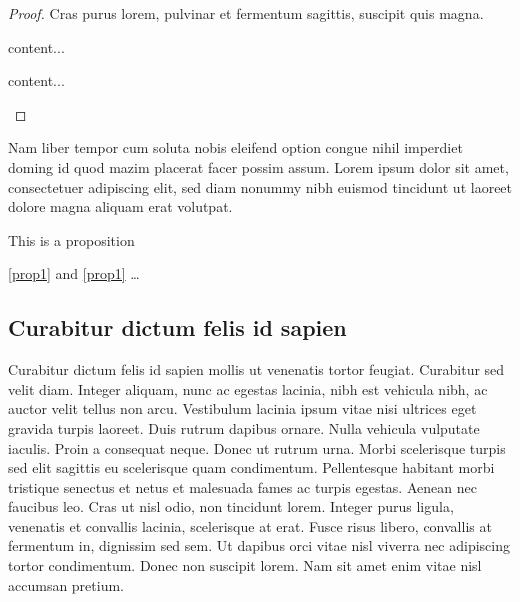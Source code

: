 \documentclass[a4paper,UKenglish,cleveref, autoref]{lipics-v2019}
\begin{document}
\begin{proof}
Cras purus lorem, pulvinar et fermentum sagittis, suscipit quis magna.

\begin{claim}
content...
\end{claim}
\begin{claimproof}
content...
\end{claimproof}

\end{proof}

\begin{corollary}
\label{lemma:curabitur}
Nam liber tempor cum soluta nobis eleifend option congue nihil imperdiet doming id quod mazim placerat facer possim assum. Lorem ipsum dolor sit amet, consectetuer adipiscing elit, sed diam nonummy nibh euismod tincidunt ut laoreet dolore magna aliquam erat volutpat.
\end{corollary}

\begin{proposition}\label{prop1}
This is a proposition
\end{proposition}

\autoref{prop1} and \cref{prop1} \ldots

\subsection{Curabitur dictum felis id sapien}

Curabitur dictum  felis id sapien mollis ut venenatis tortor feugiat. Curabitur sed velit diam. Integer aliquam, nunc ac egestas lacinia, nibh est vehicula nibh, ac auctor velit tellus non arcu. Vestibulum lacinia ipsum vitae nisi ultrices eget gravida turpis laoreet. Duis rutrum dapibus ornare. Nulla vehicula vulputate iaculis. Proin a consequat neque. Donec ut rutrum urna. Morbi scelerisque turpis sed elit sagittis eu scelerisque quam condimentum. Pellentesque habitant morbi tristique senectus et netus et malesuada fames ac turpis egestas. Aenean nec faucibus leo. Cras ut nisl odio, non tincidunt lorem. Integer purus ligula, venenatis et convallis lacinia, scelerisque at erat. Fusce risus libero, convallis at fermentum in, dignissim sed sem. Ut dapibus orci vitae nisl viverra nec adipiscing tortor condimentum. Donec non suscipit lorem. Nam sit amet enim vitae nisl accumsan pretium. 


\end{document}
